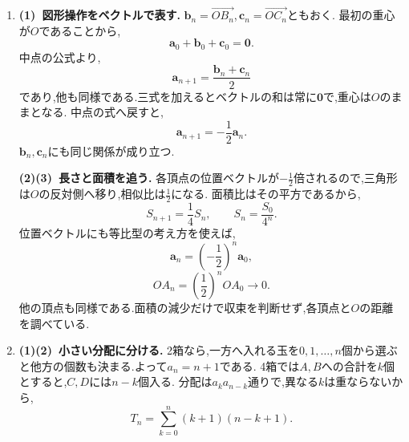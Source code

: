 \begin{enumerate}[label=\textbf{問\arabic*.},leftmargin=3.8em,format=\bookitemlink{practice-bridge}{solution}{problem}]
                \smallskip
                \textbf{(3)~平方数の余り.}
                初項も,更新式から得られる項もすべて奇数である.
                奇数の平方を$\displaystyle 4$で割った余りは$\displaystyle 1$なので,\,$\displaystyle n\ge1$の$\displaystyle a_n$の余りは$\displaystyle 2\cdot1+1=3$になる.
                平方数の余りは$0,1$なので,$a_n$は平方数でない.
                を求めず,余りので性質を調べた.
          \item \textbf{(1)~図形操作をベクトルで表す.}
                $\displaystyle \boldsymbol b_n=\overrightarrow{OB_n}$,\,$\displaystyle \boldsymbol c_n=\overrightarrow{OC_n}$ともおく.
                最初の重心が$\displaystyle O$であることから,
                \[
                  \boldsymbol a_0+\boldsymbol b_0+\boldsymbol c_0
                    =\boldsymbol0.
                \]
                中点の公式より,
                \[
                  \boldsymbol a_{n+1}
                    =\frac{\boldsymbol b_n+\boldsymbol c_n}{2}
                \]
                であり,他も同様である.三式を加えるとベクトルの和は常に$\boldsymbol0$で,重心は$O$のままとなる.
                中点の式へ戻すと,
                \[
                  \boldsymbol a_{n+1}=-\frac12\boldsymbol a_n.
                \]
                $\displaystyle \boldsymbol b_n,\boldsymbol c_n$にも同じ関係が成り立つ.

                \smallskip
                \textbf{(2)(3)~長さと面積を追う.}
                各頂点の位置ベクトルが$\displaystyle -\frac12$倍されるので,三角形は$\displaystyle O$の反対側へ移り,相似比は$\displaystyle \frac12$になる.
                面積比はその平方であるから,
                \[
                  S_{n+1}=\frac14S_n,\qquad S_n=\frac{S_0}{4^n}.
                \]
                位置ベクトルにも等比型の考え方を使えば,
                \[
                  \boldsymbol a_n=\left(-\frac12\right)^n\boldsymbol a_0,
                \]
                \[
                  OA_n=\left(\frac12\right)^n OA_0\longrightarrow0.
                \]
                他の頂点も同様である.面積の減少だけで収束を判断せず,各頂点と$\displaystyle O$の距離を調べている.
          \item \textbf{(1)(2)~小さい分配に分ける.}
                2箱なら,一方へ入れる玉を$\displaystyle 0,1,\ldots,n$個から選ぶと他方の個数も決まる.よって$\displaystyle a_n=n+1$である.
                4箱では$A,B$への合計を$k$個とすると,$C,D$には$n-k$個入る.
                分配は$a_ka_{n-k}$通りで,異なる$k$は重ならないから,
                \[
                  T_n=\sum_{k=0}^{n}(k+1)(n-k+1).
                \]


\end{enumerate}
